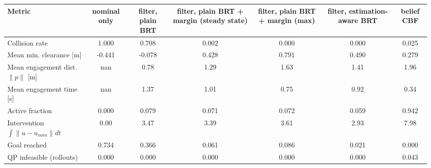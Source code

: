 \begin{tabular}{lcccccc}
\toprule
Metric & nominal only & filter, plain BRT & filter, plain BRT + margin (steady state) & filter, plain BRT + margin (max) & filter, estimation-aware BRT & belief CBF \\
\midrule
Collision rate & 1.000 & 0.708 & 0.002 & 0.000 & 0.000 & 0.025 \\
Mean min. clearance [m] & -0.441 & -0.078 & 0.428 & 0.791 & 0.490 & 0.279 \\
Mean engagement dist. $\|p\|$ [m] & nan & 0.78 & 1.29 & 1.63 & 1.41 & 1.96 \\
Mean engagement time [s] & nan & 1.37 & 1.01 & 0.75 & 0.92 & 0.34 \\
Active fraction & 0.000 & 0.079 & 0.071 & 0.072 & 0.059 & 0.942 \\
Intervention $\int\|u-u_{nom}\|dt$ & 0.00 & 3.47 & 3.39 & 3.61 & 2.93 & 7.98 \\
Goal reached & 0.734 & 0.366 & 0.061 & 0.086 & 0.021 & 0.000 \\
QP infeasible (rollouts) & 0.000 & 0.000 & 0.000 & 0.000 & 0.000 & 0.043 \\
\bottomrule
\end{tabular}